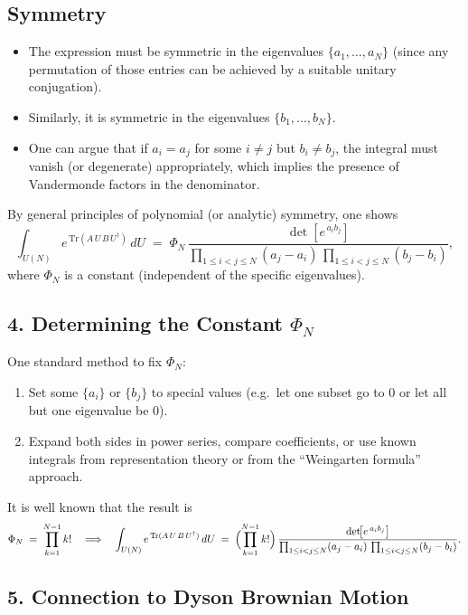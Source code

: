 \documentclass[letterpaper,11pt,oneside,reqno]{article}
\numberwithin{equation}{section}
\theoremstyle{definition}
\begin{document}
\subsection{Symmetry}

\begin{itemize}
   \item The expression must be symmetric in the eigenvalues \(\{a_1,\dots,a_N\}\) (since any permutation of those entries can be achieved by a suitable unitary conjugation).
   \item Similarly, it is symmetric in the eigenvalues \(\{b_1,\dots,b_N\}\).
   \item One can argue that if \(a_i=a_j\) for some \(i\neq j\) but \(b_i\neq b_j\), the integral must vanish (or degenerate) appropriately, which implies the presence of Vandermonde factors in the denominator.
\end{itemize}
By general principles of polynomial (or analytic) symmetry, one shows
\[
   \int_{U(N)} e^{\,\mathrm{Tr}(A\,U\,B\,U^\dagger)}\,dU
   \;=\;
   \Phi_N
   \,\frac{\det[e^{\,a_i b_j}]}{\prod_{1\le i<j\le N}(a_j-a_i)\,\prod_{1\le i<j\le N}(b_j-b_i)},
\]
where \(\Phi_N\) is a constant (independent of the specific eigenvalues).

\subsection*{4. Determining the Constant \(\Phi_N\)}

One standard method to fix \(\Phi_N\):
\begin{enumerate}
   \item Set some \(\{a_i\}\) or \(\{b_j\}\) to special values (e.g.\ let one subset go to 0 or let all but one eigenvalue be 0).
   \item Expand both sides in power series, compare coefficients, or use known integrals from representation theory or from the ``Weingarten formula'' approach.
\end{enumerate}
It is well known that the result is
\[
   \Phi_N
   \;=\;
   \prod_{k=1}^{N-1} k!
   \quad\Longrightarrow\quad
   \int_{U(N)} e^{\,\mathrm{Tr}(A\,U\,B\,U^\dagger)}\,dU
   \;=\;
   \Bigl(\prod_{k=1}^{N-1} k!\Bigr)\,
   \frac{\det\!\bigl[e^{\,a_i b_j}\bigr]}{\prod_{1\le i<j\le N}(a_j-a_i)\,\prod_{1\le i<j\le N}(b_j-b_i)}.
\]

\subsection*{5. Connection to Dyson Brownian Motion}
\end{document}
